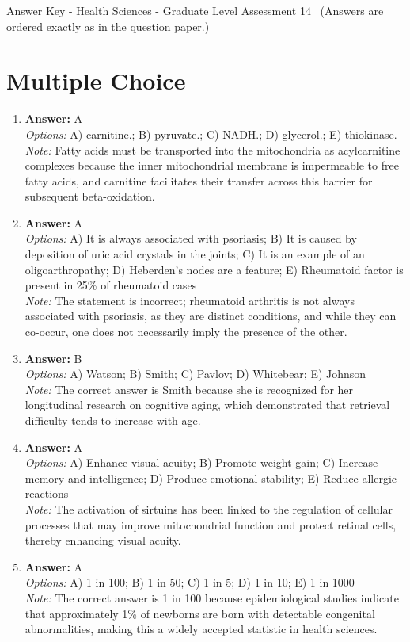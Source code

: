 \documentclass[12pt]{article}
\begin{document}
\begin{center}
Answer Key - Health Sciences - Graduate Level Assessment 14 \
\small (Answers are ordered exactly as in the question paper.)
\end{center}

\section*{Multiple Choice}
\begin{enumerate}[label=\arabic*.]
\item \textbf{Answer:} A
\\ \textit{Options:} A) carnitine.; B) pyruvate.; C) NADH.; D) glycerol.; E) thiokinase.
\\ \textit{Note:} Fatty acids must be transported into the mitochondria as acylcarnitine complexes because the inner mitochondrial membrane is impermeable to free fatty acids, and carnitine facilitates their transfer across this barrier for subsequent beta-oxidation.
\item \textbf{Answer:} A
\\ \textit{Options:} A) It is always associated with psoriasis; B) It is caused by deposition of uric acid crystals in the joints; C) It is an example of an oligoarthropathy; D) Heberden's nodes are a feature; E) Rheumatoid factor is present in 25\% of rheumatoid cases
\\ \textit{Note:} The statement is incorrect; rheumatoid arthritis is not always associated with psoriasis, as they are distinct conditions, and while they can co-occur, one does not necessarily imply the presence of the other.
\item \textbf{Answer:} B
\\ \textit{Options:} A) Watson; B) Smith; C) Pavlov; D) Whitebear; E) Johnson
\\ \textit{Note:} The correct answer is Smith because she is recognized for her longitudinal research on cognitive aging, which demonstrated that retrieval difficulty tends to increase with age.
\item \textbf{Answer:} A
\\ \textit{Options:} A) Enhance visual acuity; B) Promote weight gain; C) Increase memory and intelligence; D) Produce emotional stability; E) Reduce allergic reactions
\\ \textit{Note:} The activation of sirtuins has been linked to the regulation of cellular processes that may improve mitochondrial function and protect retinal cells, thereby enhancing visual acuity.
\item \textbf{Answer:} A
\\ \textit{Options:} A) 1 in 100; B) 1 in 50; C) 1 in 5; D) 1 in 10; E) 1 in 1000
\\ \textit{Note:} The correct answer is 1 in 100 because epidemiological studies indicate that approximately 1\% of newborns are born with detectable congenital abnormalities, making this a widely accepted statistic in health sciences.
\end{enumerate}
\end{document}
